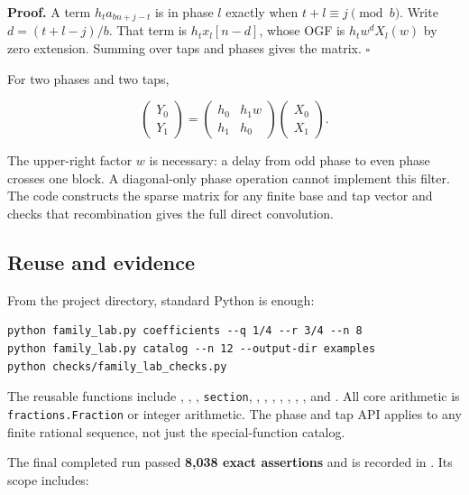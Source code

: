 \textbf{Proof.} A term \(h_t a_{bn+j-t}\) is in phase \(l\) exactly when
\(t+l\equiv j\pmod b\). Write \(d=(t+l-j)/b\). That term is
\(h_t x_l[n-d]\), whose OGF is \(h_tw^dX_l(w)\) by zero extension.
Summing over taps and phases gives the matrix. \(\square\)

For two phases and two taps,

\[
\begin{pmatrix}Y_0\\Y_1\end{pmatrix}
=\begin{pmatrix}h_0&h_1w\\h_1&h_0\end{pmatrix}
\begin{pmatrix}X_0\\X_1\end{pmatrix}.
\]

The upper-right factor \(w\) is necessary: a delay from odd phase to
even phase crosses one block. A diagonal-only phase operation cannot
implement this filter. The code constructs the sparse matrix for any
finite base and tap vector and checks that recombination gives the full
direct convolution.

\hypertarget{reuse-and-evidence}{%
\subsection{Reuse and evidence}\label{reuse-and-evidence}}

From the project directory, standard Python is enough:

\begin{verbatim}
python family_lab.py coefficients --q 1/4 --r 3/4 --n 8
python family_lab.py catalog --n 12 --output-dir examples
python checks/family_lab_checks.py
\end{verbatim}

The reusable functions include ,
, ,
\texttt{section}, , ,
, ,
, ,
, and .
All core arithmetic is \texttt{fractions.Fraction} or integer
arithmetic. The phase and tap API applies to any finite rational
sequence, not just the special-function catalog.

The final completed run passed \textbf{8,038 exact assertions} and is
recorded in . Its scope
includes:

